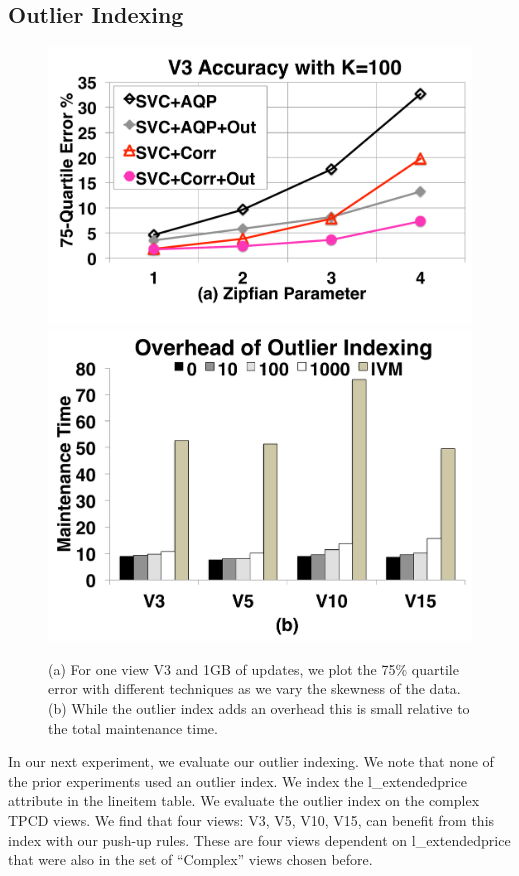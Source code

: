 \subsection{Outlier Indexing}

\begin{figure}[t]
\centering
 \includegraphics[scale=0.14]{exp/msoi_2.pdf}
 \includegraphics[scale=0.14]{exp/msoi_1.pdf}
 \caption{(a) For one view V3 and 1GB of updates, we plot the 75\% quartile error with different techniques as we vary the skewness of the data. (b) While the outlier index adds an overhead this is small relative to the total maintenance time. \vspace{-1.5em}\label{exp5-oi}}
\end{figure}
In our next experiment, we evaluate our outlier indexing.
We note that none of the prior experiments used an outlier index. 
We index the \textsf{l\_extendedprice} attribute in the \textsf{lineitem} table.
We evaluate the outlier index on the complex TPCD views.
We find that four views: V3, V5, V10, V15, can benefit from this index with our push-up rules. 
These are four views dependent on \textsf{l\_extendedprice} that were also in the set of ``Complex'' views chosen before.

